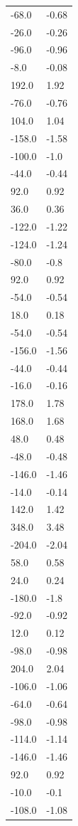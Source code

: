 \begin{longtable}{ll}
-68.0 & -0.68 \\
-26.0 & -0.26 \\
-96.0 & -0.96 \\
-8.0 & -0.08 \\
192.0 & 1.92 \\
-76.0 & -0.76 \\
104.0 & 1.04 \\
-158.0 & -1.58 \\
-100.0 & -1.0 \\
-44.0 & -0.44 \\
92.0 & 0.92 \\
36.0 & 0.36 \\
-122.0 & -1.22 \\
-124.0 & -1.24 \\
-80.0 & -0.8 \\
92.0 & 0.92 \\
-54.0 & -0.54 \\
18.0 & 0.18 \\
-54.0 & -0.54 \\
-156.0 & -1.56 \\
-44.0 & -0.44 \\
-16.0 & -0.16 \\
178.0 & 1.78 \\
168.0 & 1.68 \\
48.0 & 0.48 \\
-48.0 & -0.48 \\
-146.0 & -1.46 \\
-14.0 & -0.14 \\
142.0 & 1.42 \\
348.0 & 3.48 \\
-204.0 & -2.04 \\
58.0 & 0.58 \\
24.0 & 0.24 \\
-180.0 & -1.8 \\
-92.0 & -0.92 \\
12.0 & 0.12 \\
-98.0 & -0.98 \\
204.0 & 2.04 \\
-106.0 & -1.06 \\
-64.0 & -0.64 \\
-98.0 & -0.98 \\
-114.0 & -1.14 \\
-146.0 & -1.46 \\
92.0 & 0.92 \\
-10.0 & -0.1 \\
-108.0 & -1.08 \\

\end{longtable}
